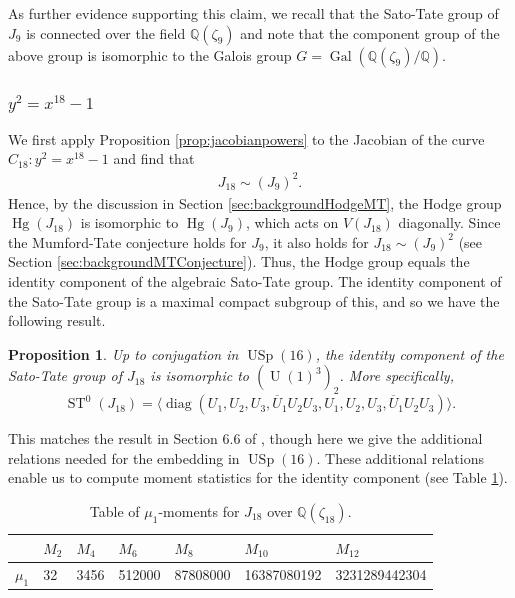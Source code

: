 \documentclass[reqno, oneside, 12pt]{amsart}
\DeclareMathOperator{\USp}{USp}
\DeclareMathOperator{\U}{U}
\DeclareMathOperator{\ST}{ST}
\DeclareMathOperator{\Gal}{Gal}
\DeclareMathOperator{\diag}{diag}
\DeclareMathOperator{\Hg}{Hg}
\newcommand{\Q}{\mathbb{Q}}
\newtheorem{proposition}[theorem]{Proposition}
\theoremstyle{remark}
\numberwithin{equation}{section}
\begin{document}
\conjectureST

As further evidence supporting this claim, we recall that the Sato-Tate group of $J_9$ is connected over the field $\Q(\zeta_9)$ and  note that the component group of the above group is isomorphic to the Galois group $G=\Gal(\Q(\zeta_9)/\Q)$.


\subsubsection{$y^2=x^{18}-1$}\label{sec:Example18}


We first apply Proposition \ref{prop:jacobianpowers} to the Jacobian of the curve $C_{18}\colon y^2=x^{18}-1$ and find that
\begin{align*}
    J_{18}\sim (J_9)^2.
\end{align*}
Hence, by the discussion in Section \ref{sec:backgroundHodgeMT}, the Hodge group $\Hg(J_{18})$ is isomorphic to $\Hg(J_9)$, which acts on $V(J_{18})$ diagonally. Since the Mumford-Tate conjecture holds for $J_9$, it also holds for $J_{18}\sim (J_9)^2$ (see Section \ref{sec:backgroundMTConjecture}). Thus, the Hodge group equals the identity component of the algebraic Sato-Tate group. The identity component of the Sato-Tate group is a maximal compact subgroup of this, and so we have the following result. 


\begin{proposition}
Up to conjugation in $\USp(16)$, the identity component of the Sato-Tate group of $J_{18}$ is isomorphic to $(\U(1)^3)_2$. More specifically, 
$$\ST^0(J_{18})=\langle\diag(U_1,U_2,U_3,\overline U_1U_2U_3,U_1,U_2,U_3,\overline U_1U_2U_3)\rangle.$$
\end{proposition}
This matches the result in Section 6.6 of \cite{EmoryGoodsonPeyrot}, though here we give the additional relations needed for the embedding in $\USp(16)$. These additional relations enable us to compute moment statistics for the identity component (see Table \ref{table:momemntsJ18zeta}).
\begin{table}[h]
\begin{tabular}{|l|l|l|l|l|l|l|}
\hline
&$M_2$ & $M_4$ & $M_6$ & $M_8$& $M_{10}$& $M_{12}$\\ 
\hline
$\mu_1$ & 32& 3456 & 512000 & 87808000 & 16387080192 & 3231289442304\\
\hline
\end{tabular}
\caption{Table of $\mu_1$-moments for $J_{18}$ over $\mathbb Q(\zeta_{18})$.}\label{table:momemntsJ18zeta}\vspace{-.2in}
\end{table}
\end{document}
